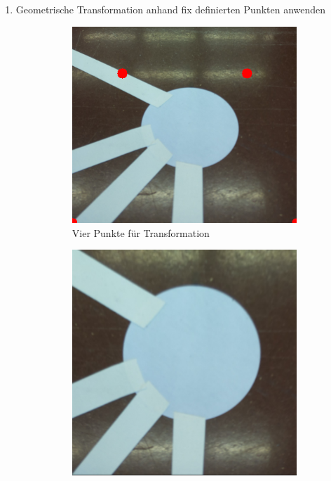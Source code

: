 \begin{enumerate}
        
    \item Geometrische Transformation anhand fix definierten Punkten anwenden
        \begin{figure}[H]
        \centering
        \begin{subfigure}{0.4\textwidth}
        \centering
        \includegraphics[width=0.95\linewidth]{assets/informatik-prototyp/opencv/angle_detection/node_before_transformation_corners.png} 
        \caption{Vier Punkte für Transformation}
        \label{fig:node-before-geometric-transform}
        \end{subfigure}
        \begin{subfigure}{0.4\textwidth}
        \centering
        \includegraphics[width=0.95\linewidth]{assets/informatik-prototyp/opencv/angle_detection/node_after_transformation.png} 

\end{subfigure}
\end{figure}
\end{enumerate}
